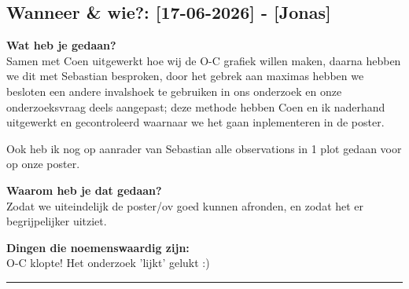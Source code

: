 
\subsection*{Wanneer \& wie?: [17-06-2026] - [Jonas]}

\textbf{Wat heb je gedaan?}\\
Samen met Coen uitgewerkt hoe wij de O-C grafiek willen maken, daarna hebben we dit met Sebastian besproken, door het gebrek aan maximas hebben we besloten een andere invalshoek te gebruiken in ons onderzoek en onze onderzoeksvraag deels aangepast; deze methode hebben Coen en ik naderhand uitgewerkt en gecontroleerd waarnaar we het gaan inplementeren in de poster. 

Ook heb ik nog op aanrader van Sebastian alle observations in 1 plot gedaan voor op onze poster.
\vspace{0.3cm} 

\noindent \textbf{Waarom heb je dat gedaan?}\\
Zodat we uiteindelijk de poster/ov goed kunnen afronden, en zodat het er begrijpelijker uitziet.

\noindent \textbf{Dingen die noemenswaardig zijn:}\\
O-C klopte! Het onderzoek 'lijkt' gelukt :)


\vspace{0.5cm}
\hrule 
\vspace{0.5cm}
